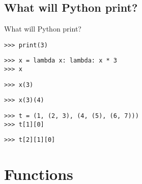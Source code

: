 \documentclass[9pt]{beamer}
\begin{document}
\subsection{What will Python print?}
\begin{frame}[fragile]{What will Python print?}
  \begin{lstlisting}[numbers=none, frame=none, xleftmargin=0pt]
>>> print(3)
  \end{lstlisting}
  \begin{lstlisting}[numbers=none, frame=none, xleftmargin=0pt]
>>> x = lambda x: lambda: x * 3
>>> x
  \end{lstlisting}
  \begin{lstlisting}[numbers=none, frame=none, xleftmargin=0pt]
>>> x(3)
  \end{lstlisting}
  \begin{lstlisting}[numbers=none, frame=none, xleftmargin=0pt]
>>> x(3)(4)
  \end{lstlisting}
  \begin{lstlisting}[numbers=none, frame=none, xleftmargin=0pt]
>>> t = (1, (2, 3), (4, (5), (6, 7)))
>>> t[1][0]
  \end{lstlisting}
  \begin{lstlisting}[numbers=none, frame=none, xleftmargin=0pt]
>>> t[2][1][0]
  \end{lstlisting}
\end{frame}

\section{Functions}
\end{document}
